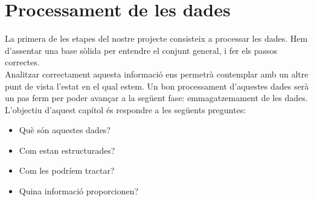 \chapter{Processament de les dades}\label{ch:log-processing}

La primera de les etapes del nostre projecte consisteix a processar les dades.
Hem d'assentar una base sòlida per entendre el conjunt general, i fer els passos correctes. \\

\noindent
Analitzar correctament aquesta informació ens permetrà contemplar amb un altre punt de vista l'estat en el qual estem.
Un bon processament d'aquestes dades serà un pas ferm per poder avançar a la següent fase: emmagatzemament de les dades. \\

\noindent
L'objectiu d'aquest capítol és respondre a les següents preguntes:

\begin{itemize}
    \item Què són aquestes dades?
    \item Com estan estructurades?
    \item Com les podríem tractar?
    \item Quina informació proporcionen?
\end{itemize}


\clearpage

